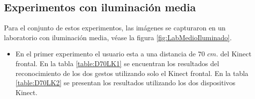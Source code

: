 \subsection{Experimentos con iluminación media} 
Para el conjunto de estos experimentos, las imágenes se capturaron en un laboratorio con iluminación media, véase la figura \ref{fig:LabMedioIluminado}.

\begin{itemize}

\item En el primer experimento el usuario esta a una distancia de $70$ $cm.$ del Kinect frontal. En la tabla \ref{table:D70LK1} se encuentran los resultados del reconocimiento de los dos gestos utilizando solo el Kinect frontal. En la tabla \ref{table:D70LK2} se presentan los resultados utilizando los dos dispositivos Kinect.  

%


\end{itemize}
